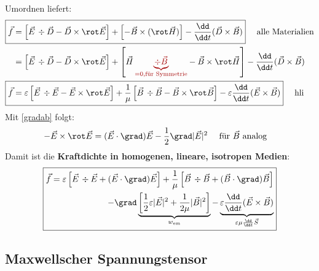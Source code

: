 			                Umordnen liefert:
			                \begin{align}
			        \Aboxed{\vec{f} & = \left[ \vec{E}\, \div \vec{D}  - \vec{D}  \times \rot \vec{E}\right] + \left[-\vec{B} \times ( \rot \vec{H} )\right] - \frac{\dd }{\dd t}(\vec{D}  \times \vec{B} )} \quad \text{ alle Materialien}\\
			                & = \left[ \vec{E}\, \div \vec{D}  - \vec{D}  \times \rot \vec{E}\right] + \left[\vec{H} \,\textcolor{red}{\underbrace{\div \vec{B}}_{=0, \text{für Symmetrie} }}-\vec{B} \times \rot \vec{H} \right] - \frac{\dd }{\dd t}(\vec{D}  \times \vec{B} )\nonumber\\
			       \Aboxed{\vec{f}& = \varepsilon\left[ \vec{E}\, \div \vec{E} - \vec{E} \times \rot \vec{E}\right] + \frac{1}{\mu}\left[\vec{B} \,\div \vec{B} -\vec{B} \times \rot \vec{B} \right] - \varepsilon\frac{\dd }{\dd t}(\vec{E} \times \vec{B} ) } \quad \text{ hli}
		        \end{align}
	Mit \ref{gradab} folgt:	   
		        \begin{equation*}\begin{split}
				         - \vec{E} \times \rot \vec{E} &= (\vec{E}\cdot\grad )\vec{E} - \frac{1}{2}\grad |\vec{E}|^2\quad \text{ für }\vec{B} \text{ analog}
			        \end{split}\end{equation*}
		   Damit ist die \textbf{Kraftdichte in homogenen, lineare, isotropen Medien}:
		        \begin{equation}
		        	\boxed{
			        \begin{split}
				        \vec{f}=  \varepsilon\left[ \vec{E}\, \div \vec{E} +(\vec{E}\cdot\grad )\vec{E}\right] + \frac{1}{\mu}\left[\vec{B} \,\div \vec{B}  + (\vec{B} \cdot\grad )\vec{B} \right] \\-\grad \underbrace{\left[ \frac{1}{2}\varepsilon|\vec{E}|^2 +\frac{1}{2\mu} |\vec{B} |^2  \right]}_{w_\text{em}}- \underbrace{\varepsilon\frac{\dd }{\dd t}(\vec{E} \times \vec{B} )}_{\varepsilon\mu\frac{\dd }{\dd t} \vec{S}}
			        \end{split}}
		        \end{equation}
  \subsection{Maxwellscher Spannungstensor}\label{spanten}
